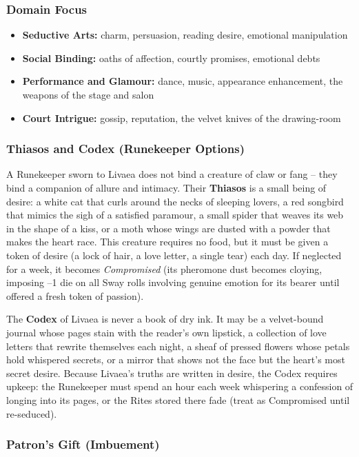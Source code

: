 \subsubsection*{Domain Focus}
\begin{itemize}
  \item \textbf{Seductive Arts:} charm, persuasion, reading desire, emotional manipulation
  \item \textbf{Social Binding:} oaths of affection, courtly promises, emotional debts
  \item \textbf{Performance and Glamour:} dance, music, appearance enhancement, the weapons of the stage and salon
  \item \textbf{Court Intrigue:} gossip, reputation, the velvet knives of the drawing-room
\end{itemize}

\subsubsection*{Thiasos and Codex (Runekeeper Options)}

A Runekeeper sworn to Livaea does not bind a creature of claw or fang -- they bind a companion of allure and intimacy. Their \textbf{Thiasos} is a small being of desire: a white cat that curls around the necks of sleeping lovers, a red songbird that mimics the sigh of a satisfied paramour, a small spider that weaves its web in the shape of a kiss, or a moth whose wings are dusted with a powder that makes the heart race. This creature requires no food, but it must be given a token of desire (a lock of hair, a love letter, a single tear) each day. If neglected for a week, it becomes \textit{Compromised} (its pheromone dust becomes cloying, imposing --1 die on all Sway rolls involving genuine emotion for its bearer until offered a fresh token of passion).

The \textbf{Codex} of Livaea is never a book of dry ink. It may be a velvet-bound journal whose pages stain with the reader's own lipstick, a collection of love letters that rewrite themselves each night, a sheaf of pressed flowers whose petals hold whispered secrets, or a mirror that shows not the face but the heart's most secret desire. Because Livaea's truths are written in desire, the Codex requires upkeep: the Runekeeper must spend an hour each week whispering a confession of longing into its pages, or the Rites stored there fade (treat as Compromised until re-seduced).

\subsubsection*{Patron's Gift (Imbuement)}

